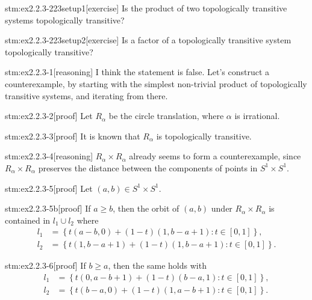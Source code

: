 
\begin{stm}{stm:ex2.2.3-223setup1}[exercise]
Is the product of two topologically transitive systems topologically transitive?
\end{stm}

\begin{stm}{stm:ex2.2.3-223setup2}[exercise]
Is a factor of a topologically transitive system topologically transitive?
\end{stm}


\begin{stm}{stm:ex2.2.3-1}[reasoning]
I think the statement is false. Let's construct a counterexample, by starting with the simplest non-trivial product of topologically transitive systems, and iterating from there.
\end{stm}

\begin{stm}{stm:ex2.2.3-2}[proof]
Let $R_\alpha$ be the circle translation, where $\alpha$ is irrational.
\end{stm}

\begin{stm}{stm:ex2.2.3-3}[proof]
It is known that $R_\alpha$ is topologically transitive.
\end{stm}

\begin{stm}{stm:ex2.2.3-4}[reasoning]
$R_\alpha \times R_\alpha$ already seems to form a counterexample, since $R_\alpha \times R_\alpha$ preserves the distance between the components of points in $S^1 \times S^1$.
\end{stm}

\begin{stm}{stm:ex2.2.3-5}[proof]
Let $(a,b) \in S^1 \times S^1$. 
\end{stm}

\begin{stm}{stm:ex2.2.3-5b}[proof]
If $a \geq b$, then the orbit of $(a,b)$ under $R_\alpha \times R_\alpha$ is contained in $l_1 \cup l_2$ where
\begin{align*}
l_1 &= \left\{ t(a-b,0) + (1 - t)(1, b-a+1) : t \in [0,1] \right\}, \\
l_2 &= \left\{ t(1, b-a+1) + (1 - t)(1, b-a+1) : t \in [0,1] \right\}.
\end{align*}
\end{stm}

\begin{stm}{stm:ex2.2.3-6}[proof]
If $b \geq a$, then the same holds with
\begin{align*}
l_1 &= \left\{ t(0, a-b+1) + (1 - t)(b - a, 1) : t \in [0,1] \right\}, \\
l_2 &= \left\{ t(b-a, 0) + (1 - t)(1, a-b+1) : t \in [0,1] \right\}.
\end{align*}
\end{stm}


